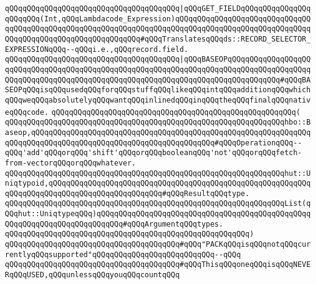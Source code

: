 \verb|qQQqqQQqqQQqqQQqqQQqqQQqqQQqqQQqqQQqqQQq|\verb#|qQQqGET_FIELDqQQqqQQqqQQqqQQqqQQqqQQq(Int,qQQqLambdacode_Expression)qQQqqQQqqQQqqQQqqQQqqQQqqQQqqQQqqQQqqQQqqQQqqQQqqQQqqQQqqQQqqQQqqQQqqQQqqQQqqQQqqQQqqQQqqQQqqQQqqQQqqQQqqQQqqQQqqQQqqQQqqQQqqQQqqQQq#\verb|#qQQqTranslatesqQQqds::RECORD_SELECTOR_EXPRESSIONqQQq--qQQqi.e.,qQQqrecord.field.|\newline
\newline
\verb|qQQqqQQqqQQqqQQqqQQqqQQqqQQqqQQqqQQqqQQq|\verb#|qQQqBASEOPqQQqqQQqqQQqqQQqqQQqqQQqqQQqqQQqqQQqqQQqqQQqqQQqqQQqqQQqqQQqqQQqqQQqqQQqqQQqqQQqqQQqqQQqqQQqqQQqqQQqqQQqqQQqqQQqqQQqqQQqqQQqqQQqqQQqqQQqqQQqqQQqqQQqqQQq#\verb|#qQQqBASEOPqQQqisqQQqusedqQQqforqQQqstuffqQQqlikeqQQqintqQQqadditionqQQqwhichqQQqweqQQqabsolutelyqQQqwantqQQqinlinedqQQqinqQQqtheqQQqfinalqQQqnativeqQQqcode.|\newline
\verb|qQQqqQQqqQQqqQQqqQQqqQQqqQQqqQQqqQQqqQQqqQQqqQQqqQQqqQQq(|\newline
\verb|qQQqqQQqqQQqqQQqqQQqqQQqqQQqqQQqqQQqqQQqqQQqqQQqqQQqqQQqqQQqqQQqhbo::Baseop,qQQqqQQqqQQqqQQqqQQqqQQqqQQqqQQqqQQqqQQqqQQqqQQqqQQqqQQqqQQqqQQqqQQqqQQqqQQqqQQqqQQqqQQqqQQqqQQqqQQqqQQqqQQqqQQq#qQQqOperationqQQq--qQQq'add'qQQqorqQQq'shift'qQQqorqQQqbooleanqQQq'not'qQQqorqQQqfetch-from-vectorqQQqorqQQqwhatever.|\newline
\verb|qQQqqQQqqQQqqQQqqQQqqQQqqQQqqQQqqQQqqQQqqQQqqQQqqQQqqQQqqQQqqQQqhut::Uniqtypoid,qQQqqQQqqQQqqQQqqQQqqQQqqQQqqQQqqQQqqQQqqQQqqQQqqQQqqQQqqQQqqQQqqQQqqQQqqQQqqQQqqQQqqQQqqQQqqQQq#qQQqResultqQQqtype.|\newline
\verb|qQQqqQQqqQQqqQQqqQQqqQQqqQQqqQQqqQQqqQQqqQQqqQQqqQQqqQQqqQQqqQQqList(qQQqhut::UniqtypeqQQq)qQQqqQQqqQQqqQQqqQQqqQQqqQQqqQQqqQQqqQQqqQQqqQQqqQQqqQQqqQQqqQQqqQQqqQQqqQQq#qQQqArgumentqQQqtypes.|\newline
\verb|qQQqqQQqqQQqqQQqqQQqqQQqqQQqqQQqqQQqqQQqqQQqqQQqqQQqqQQq)|\newline
\newline
\newline
\newline
\newline
\verb|qQQqqQQqqQQqqQQqqQQqqQQqqQQqqQQqqQQqqQQq#qQQq"PACKqQQqisqQQqnotqQQqcurrentlyqQQqsupported"qQQqqQQqqQQqqQQqqQQqqQQqqQQq--qQQq|\newline
\verb|qQQqqQQqqQQqqQQqqQQqqQQqqQQqqQQqqQQqqQQq#qQQqThisqQQqoneqQQqisqQQqNEVERqQQqUSED,qQQqunlessqQQqyouqQQqcountqQQq|\newline
